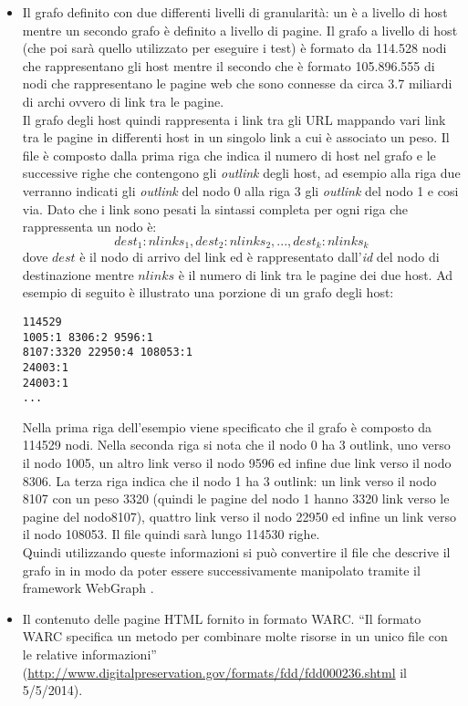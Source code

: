 \begin{itemize}
 
 \item Il grafo definito con due differenti livelli di granularità: un è a livello di host mentre un secondo grafo è definito a livello di pagine. Il grafo a livello di host (che poi sarà quello utilizzato per eseguire i test) è formato da 114.528 nodi che rappresentano gli host mentre il secondo che è formato  105.896.555 di nodi che rappresentano le pagine web che sono connesse da circa 3.7 miliardi di archi ovvero di link tra le pagine.\\
 Il grafo degli host quindi rappresenta i link tra gli URL mappando vari link tra le pagine in differenti host in un singolo link a cui è associato un peso. Il file è composto dalla prima riga che indica il numero di host nel grafo e le successive righe che contengono gli \textit{outlink} degli host, ad esempio alla riga due verranno indicati gli \textit{outlink} del nodo 0 alla riga 3 gli \textit{outlink} del nodo 1 e cosi via. Dato che i link sono pesati la sintassi completa per ogni riga che rappressenta un nodo è:
 $$
 dest_1:nlinks_1,dest_2:nlinks_2,...,dest_k:nlinks_k
 $$
 dove \(dest\) è il nodo di arrivo del link ed è rappresentato dall'\textit{id} del nodo di destinazione mentre \(nlinks\) è il numero di link tra le pagine dei due host.
 Ad esempio di seguito è illustrato una porzione di un grafo degli host:
\begin{lstlisting}[frame=trbl,postbreak=\space, breakindent=5pt, breaklines]
114529
1005:1 8306:2 9596:1 
8107:3320 22950:4 108053:1
24003:1
24003:1
...
\end{lstlisting}
Nella prima riga dell'esempio viene specificato che il grafo è composto da 114529 nodi. Nella seconda riga si nota che il nodo 0 ha 3 outlink, uno verso il nodo 1005, un altro link verso il nodo 9596 ed infine due link verso il nodo 8306. La terza riga indica che il nodo 1 ha 3 outlink: un link verso il nodo 8107 con un peso 3320 (quindi le pagine del nodo 1 hanno 3320 link verso le pagine del nodo8107), quattro link verso il nodo 22950 ed infine un link verso il nodo 108053. Il file quindi sarà lungo 114530 righe.\\
Quindi utilizzando queste informazioni si può convertire il file che descrive il grafo in  in modo da poter essere successivamente manipolato tramite il framework WebGraph \cite{Boldi03thewebgraph}.
\item Il contenuto delle pagine HTML fornito in formato WARC. ``Il formato WARC specifica un metodo per combinare molte risorse in un unico file con le relative informazioni'' (\url{http://www.digitalpreservation.gov/formats/fdd/fdd000236.shtml} il 5/5/2014).
\end{itemize}

